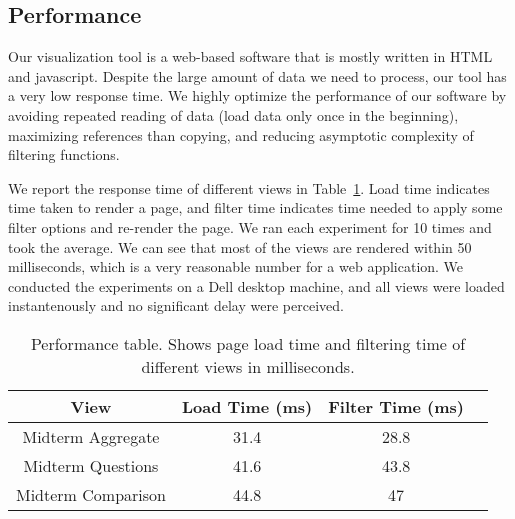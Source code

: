 \subsection{Performance}
Our visualization tool is a web-based software that is mostly written in HTML and javascript. Despite the large amount of data we need to process, our tool has a very low response time. We highly optimize the performance of our software by avoiding repeated reading of data (load data only once in the beginning), maximizing references than copying, and reducing asymptotic complexity of filtering functions.

We report the response time of different views in Table~\ref{tab:performance}. Load time indicates time taken to render a page, and filter time indicates time needed to apply some filter options and re-render the page. We ran each experiment for 10 times and took the average. We can see that most of the views are rendered within 50 milliseconds, which is a very reasonable number for a web application. We conducted the experiments on a Dell desktop machine, and all views were loaded instantenously and no significant delay were perceived.

\begin{table}
\begin{tabular}{ | c | c | c | c |}
  \hline
  View & Load Time (ms) & Filter Time (ms) \\ \hline
  Midterm Aggregate & 31.4 & 28.8 \\ \hline
  Midterm Questions & 41.6 & 43.8 \\ \hline
  Midterm Comparison & 44.8 & 47 \\ \hline
\end{tabular}
\caption{Performance table. Shows page load time and filtering time of different views in milliseconds.}
\label{tab:performance}
\end{table}
